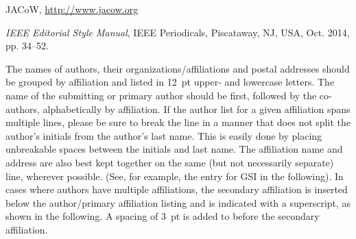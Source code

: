 \documentclass[a4paper,
              ]{jacow}
\begin{document}
\iffalse  %
	\newpage
	\printbibliography

\else

\begin{thebibliography}{9} %


	JACoW,
	\url{http://www.jacow.org}

	\textit{IEEE Editorial Style Manual},
	IEEE Periodicals, Piscataway,
	NJ, USA, Oct. 2014, pp. 34--52.
\end{thebibliography}

\fi

\newpage


The names of authors, their organizations/affiliations
and postal addresses should be grouped by affiliation and
listed in \SI{12}{pt} upper- and lowercase letters. The name of
the submitting or primary author should be first, followed
by the co-authors, alphabetically by affiliation. If the
author list for a given affiliation spans multiple lines,
please be sure to break the line in a manner that does not
split the author’s initials from the author’s last name. This
is easily done by placing unbreakable spaces between the
initials and last name. The affiliation name and address
are also best kept together on the same (but not necessarily
separate) line, wherever possible. (See, for example,
the entry for GSI in the following). In cases where authors
have multiple affiliations, the secondary affiliation is
inserted below the author/primary affiliation listing and is
indicated with a superscript, as shown in the following. A
spacing of \SI{3}{pt} is added to before the secondary affiliation.

\newpage
\end{document}
